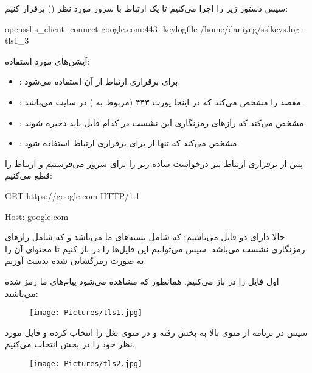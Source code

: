 \documentclass{report}
\begin{document}
\noindent
سپس دستور زیر را اجرا می‌کنیم تا یک ارتباط با سرور مورد نظر () برقرار کنیم:
\begin{LTR}
	\begin{latin}
		openssl s\_client -connect google.com:443 -keylogfile /home/daniyeg/sslkeys.log -tls1\_3
	\end{latin}
\end{LTR}

\noindent
آپشن‌های مورد استفاده:
\begin{itemize}
	\item
	:
	برای برقراری ارتباط از آن استفاده می‌شود.
	\item 
	:
	مقصد را مشخص می‌کند که در اینجا پورت ۴۴۳ (مربوط به ) در سایت  می‌باشد.
	\item 
	:
	مشخص می‌کند که رازهای رمزنگاری این نشست در کدام فایل باید ذخیره شوند.
	\item 
	:
	مشخص می‌کند که تنها از  برای برقراری ارتباط استفاده شود.
\end{itemize}

پس از برقراری ارتباط نیز درخواست  ساده زیر را برای سرور می‌فرستیم و ارتباط را قطع می‌کنیم:
\begin{LTR}
	\begin{latin}
		GET https://google.com HTTP/1.1

		Host: google.com
	\end{latin}
\end{LTR}

حالا دارای دو فایل می‌باشیم:  که شامل بسته‌های ما می‌باشد و  که شامل رازهای رمزنگاری نشست می‌باشد. سپس می‌توانیم این فایل‌ها را در  باز کنیم تا محتوای آن را به صورت رمزگشایی شده بدست آوریم.

\noindent
اول فایل  را در  باز می‌کنیم. همانطور که مشاهده می‌شود پیام‌های ما رمز شده می‌باشند:
\begin{figure}[H]
	\centering
	\texttt{[image: Pictures/tls1.jpg]}
	\label{tls1}
\end{figure}

\noindent
سپس در برنامه  از منوی بالا به بخش  رفته و در منوی بغل  را انتخاب کرده و فایل مورد نظر خود را در بخش  انتخاب می‌کنیم.
\begin{figure}[H]
	\centering
	\texttt{[image: Pictures/tls2.jpg]}
	\label{tls2}
\end{figure}
\end{document}
